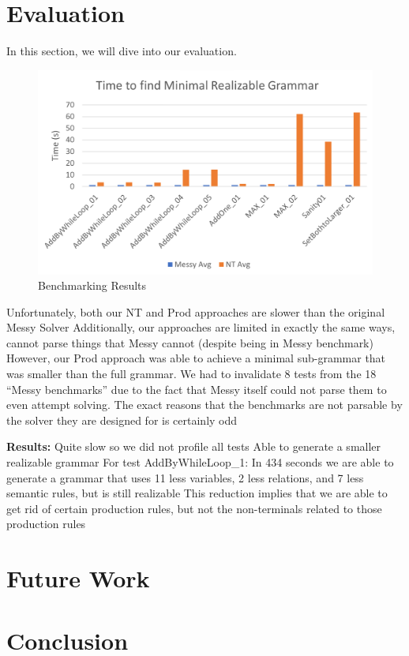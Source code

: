 \documentclass[acmsmall, nonacm]{acmart}
\begin{document}
\section{Evaluation}
In this section, we will dive into our evaluation.
\begin{figure}[ht]
  \centering
  \includegraphics[width=1\textwidth]{Results.png}
  \caption{Benchmarking Results}
  \label{fig:Benchmarking-Results}
\end{figure}
Unfortunately, both our NT and Prod approaches are slower than the original Messy Solver
Additionally, our approaches are limited in exactly the same ways, cannot parse things that Messy cannot (despite being in Messy benchmark)
However, our Prod approach was able to achieve a minimal sub-grammar that was smaller than the full grammar.
We had to invalidate 8 tests from the 18 “Messy benchmarks” due to the fact that Messy itself could not parse them to even attempt solving.
The exact reasons that the benchmarks are not parsable by the solver they are designed for is certainly odd


\textbf{Results:}
Quite slow so we did not profile all tests
Able to generate a smaller realizable grammar
For test AddByWhileLoop_1:
In 434 seconds we are able to generate a grammar that uses 11 less variables, 2 less relations, and 7 less semantic rules, but is still realizable
This reduction implies that we are able to get rid of certain production rules, but not the non-terminals related to those production rules

\section{Future Work}

\section{Conclusion}



\end{document}
